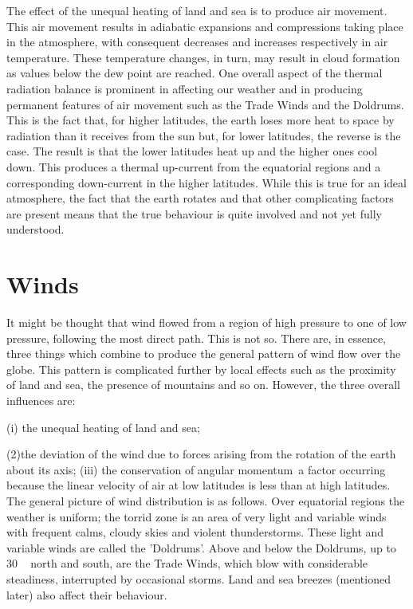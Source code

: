 The effect of the unequal heating of land and sea is to produce air movement. This air
movement results in adiabatic expansions and compressions taking place in the atmosphere,
with consequent decreases and increases respectively in air temperature. These temperature
changes, in turn, may result in cloud formation as values below the dew point are reached.
One overall aspect of the thermal radiation balance is prominent in affecting our weather
and in producing permanent features of air movement such as the Trade Winds and the
Doldrums. This is the fact that, for higher latitudes, the earth loses more heat to space by
radiation than it receives from the sun but, for lower latitudes, the reverse is the case. The
result is that the lower latitudes heat up and the higher ones cool down. This produces a
thermal up-current from the equatorial regions and a corresponding down-current in the
higher latitudes. While this is true for an ideal atmosphere, the fact that the earth rotates
and that other complicating factors are present means that the true behaviour is quite
involved and not yet fully understood.


\section{ Winds}
It might be thought that wind flowed from a region of high pressure to one of low pressure,
following the most direct path. This is not so. There are, in essence, three things which
combine to produce the general pattern of wind flow over the globe. This pattern is
complicated further by local effects such as the proximity of land and sea, the presence of
mountains and so on. However, the three overall influences are:


(i) the unequal heating of land and sea;

(2)the deviation of the wind due to forces arising from the rotation of the earth about its
axis;
(iii) the conservation of angular momentum~a factor occurring because the linear velocity
of air at low latitudes is less than at high latitudes.
The general picture of wind distribution is as follows. Over equatorial regions the weather
is uniform; the torrid zone is an area of very light and variable winds with frequent calms,
cloudy skies and violent thunderstorms. These light and variable winds are called the
'Doldrums'. Above and below the Doldrums, up to 30 ~ north and south, are the Trade
Winds, which blow with considerable steadiness, interrupted by occasional storms. Land
and sea breezes (mentioned later) also affect their behaviour.

